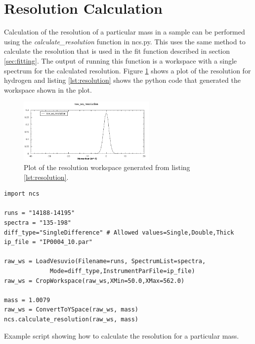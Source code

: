 \documentclass[paper=a4, fontsize=11pt]{scrartcl}	%
\numberwithin{equation}{section}															%
\numberwithin{figure}{section}																%
\numberwithin{table}{section}
\begin{document}
\section{Resolution Calculation}
Calculation of the resolution of a particular mass in a sample can be performed using the \textit{calculate\_resolution} function in ncs.py. This uses the same method to calculate the resolution that is used in the fit function described in section \ref{sec:fitting}. The output of running this function is a workspace with a single spectrum for the calculated resolution. Figure \ref{fig:resolution} shows a plot of the resolution for hydrogen and listing \ref{lst:resolution} shows the python code that generated the workspace shown in the plot.

\begin{figure}[H]
\centering
\includegraphics[width=0.6\textwidth]{img/resolution.png}
\caption{Plot of the resolution workspace generated from listing \ref{lst:resolution}.}
\label{fig:resolution}
\end{figure}


\begin{listing}[H]
\begin{verbatim}
import ncs

runs = "14188-14195"
spectra = "135-198"
diff_type="SingleDifference" # Allowed values=Single,Double,Thick
ip_file = "IP0004_10.par"

raw_ws = LoadVesuvio(Filename=runs, SpectrumList=spectra,
		     Mode=diff_type,InstrumentParFile=ip_file)
raw_ws = CropWorkspace(raw_ws,XMin=50.0,XMax=562.0)

mass = 1.0079
raw_ws = ConvertToYSpace(raw_ws, mass)
ncs.calculate_resolution(raw_ws, mass)
\end{verbatim}
\caption{Example script showing how to calculate the resolution for a particular mass.}
\label{lst:resolution}
\end{listing}
\end{document}
